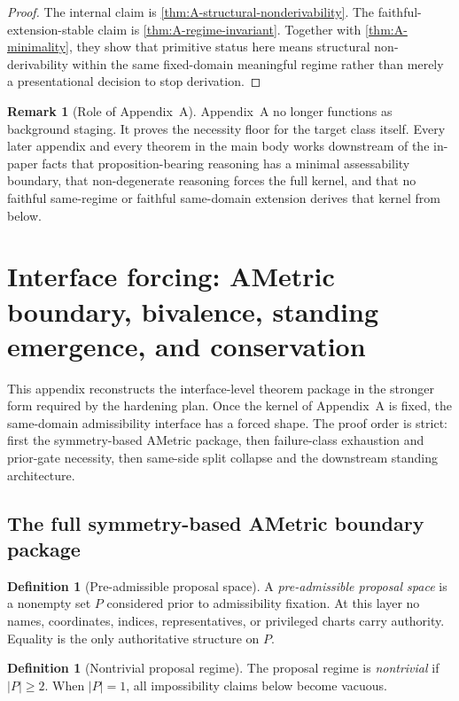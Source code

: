 \documentclass[11pt]{article}
\theoremstyle{plain}
\theoremstyle{definition}
\newtheorem{definition}[theorem]{Definition}
\newtheorem{remark}[theorem]{Remark}
\begin{document}
\begin{proof}
The internal claim is \cref{thm:A-structural-nonderivability}. The faithful-extension-stable claim is \cref{thm:A-regime-invariant}. Together with \cref{thm:A-minimality}, they show that primitive status here means structural non-derivability within the same fixed-domain meaningful regime rather than merely a presentational decision to stop derivation.
\end{proof}

\begin{remark}[Role of Appendix~A]
Appendix~A no longer functions as background staging. It proves the necessity floor for the target class itself. Every later appendix and every theorem in the main body works downstream of the in-paper facts that proposition-bearing reasoning has a minimal assessability boundary, that non-degenerate reasoning forces the full kernel, and that no faithful same-regime or faithful same-domain extension derives that kernel from below.
\end{remark}

\section{Interface forcing: AMetric boundary, bivalence, standing emergence, and conservation}
\label{app:interface}

This appendix reconstructs the interface-level theorem package in the stronger form required by the hardening plan. Once the kernel of Appendix~A is fixed, the same-domain admissibility interface has a forced shape. The proof order is strict: first the symmetry-based AMetric package, then failure-class exhaustion and prior-gate necessity, then same-side split collapse and the downstream standing architecture.

\subsection{The full symmetry-based AMetric boundary package}

\begin{definition}[Pre-admissible proposal space]
A \emph{pre-admissible proposal space} is a nonempty set $P$ considered prior to admissibility fixation. At this layer no names, coordinates, indices, representatives, or privileged charts carry authority. Equality is the only authoritative structure on $P$.
\end{definition}

\begin{definition}[Nontrivial proposal regime]
The proposal regime is \emph{nontrivial} if $|P|\ge 2$. When $|P|=1$, all impossibility claims below become vacuous.
\end{definition}
\end{document}
